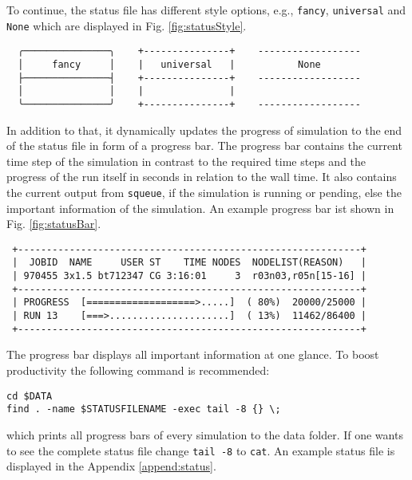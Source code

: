 To continue, the status file has different style options, e.g., \texttt{fancy}, \texttt{universal} and \texttt{None} which are displayed in Fig. \ref{fig:statusStyle}. 
\begin{center}
\captionsetup{type=figure}
\begin{verbatim}
  ╭───────────────╮    +---------------+    ------------------
  │     fancy     │    |   universal   |           None
  ├───────────────┤    +---------------+    ------------------
  │               │    |               |    
  ╰───────────────╯    +---------------+    ------------------
\end{verbatim}
\label{fig:statusStyle}
\end{center}
In addition to that, it dynamically updates the progress of simulation to the end of the status file in form of a progress bar. The progress bar contains the current time step of the simulation in contrast to the required time steps and the progress of the run itself in seconds in relation to the wall time. It also contains the current output from \texttt{squeue}, if the simulation is running or pending, else the important information of the simulation. An example progress bar ist shown in Fig. \ref{fig:statusBar}.
\begin{center}
\captionsetup{type=figure}
\begin{verbatim}
 +------------------------------------------------------------+
 |  JOBID  NAME     USER ST    TIME NODES  NODELIST(REASON)   |
 | 970455 3x1.5 bt712347 CG 3:16:01     3  r03n03,r05n[15-16] |
 +------------------------------------------------------------+
 | PROGRESS  [===================>.....]  ( 80%)  20000/25000 |
 | RUN 13    [===>.....................]  ( 13%)  11462/86400 |
 +------------------------------------------------------------+
\end{verbatim}
\label{fig:statusBar}
\end{center}
The progress bar displays all important information at one glance. To boost productivity the following command is recommended:
\begin{lstlisting}
cd $DATA 
find . -name $STATUSFILENAME -exec tail -8 {} \;
\end{lstlisting}
which prints all progress bars of every simulation to the data folder. If one wants to see the complete status file change \texttt{tail -8} to \texttt{cat}.
An example status file is displayed in the Appendix \ref{append:status}.

